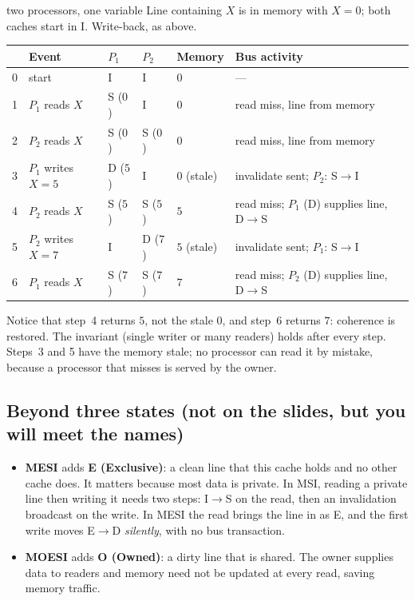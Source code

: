 \begin{workedex}{two processors, one variable}
Line containing $X$ is in memory with $X=0$; both caches start in I. Write-back, as above.
\begin{center}
\small
\begin{tabular}{@{}cllllll@{}}
\toprule
 & Event & $P_1$ & $P_2$ & Memory & Bus activity\\
\midrule
0 & start & I & I & $0$ & ---\\
1 & $P_1$ reads $X$ & S ($0$) & I & $0$ & read miss, line from memory\\
2 & $P_2$ reads $X$ & S ($0$) & S ($0$) & $0$ & read miss, line from memory\\
3 & $P_1$ writes $X{=}5$ & D ($5$) & I & $0$ (stale) & invalidate sent; $P_2$: S$\to$I\\
4 & $P_2$ reads $X$ & S ($5$) & S ($5$) & $5$ & read miss; $P_1$ (D) supplies line, D$\to$S\\
5 & $P_2$ writes $X{=}7$ & I & D ($7$) & $5$ (stale) & invalidate sent; $P_1$: S$\to$I\\
6 & $P_1$ reads $X$ & S ($7$) & S ($7$) & $7$ & read miss; $P_2$ (D) supplies line, D$\to$S\\
\bottomrule
\end{tabular}
\end{center}
Notice that step~4 returns $5$, not the stale $0$, and step~6 returns $7$: coherence is restored. The invariant (single writer or many
readers) holds after every step. Steps~3 and 5 have the memory stale; no processor can read it by mistake,
because a processor that misses is served by the owner.
\end{workedex}

\subsection{Beyond three states (not on the slides, but you will meet the names)}

\begin{itemize}
  \item \textbf{MESI} adds \textbf{E (Exclusive)}: a clean line that this cache holds and no other cache does. It matters
        because most data is private. In MSI, reading a private line then writing it needs two steps: I$\to$S on the read, then an
        invalidation broadcast on the write. In MESI the read brings the line in as E, and the first write moves E$\to$D \emph{silently},
        with no bus transaction.
  \item \textbf{MOESI} adds \textbf{O (Owned)}: a dirty line that is shared. The owner supplies data to readers and
        memory need not be updated at every read, saving memory traffic.
\end{itemize}

